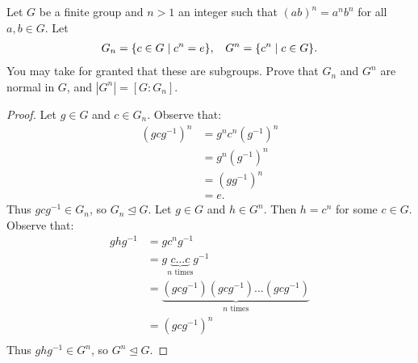 \documentclass[11pt,twoside,openany]{memoir}
\begin{document}
    \begin{exercise}
        Let $G$ be a finite group and $n > 1$ an integer such that $(ab)^n = a^n b^n$ for all $a,b \in G$. Let 
            \begin{equation*}
            \begin{split}
                G_n = \{c \in G \mid c^n = e\}, \h9 G^n = \{c^n \mid c \in G\}.
            \end{split}
            \end{equation*}
        You may take for granted that these are subgroups. Prove that $G_n$ and $G^n$ are normal in $G$, and $|G^n| = [G : G_n]$.
    \end{exercise}
        {\color{blue} \begin{proof}
            Let $g \in G$ and $c \in G_n$. Observe that:
                \begin{equation*}
                \begin{split}
                    (gcg^{-1})^n 
                    & = g^n c^n (g^{-1})^n \\
                    & = g^n (g^{-1})^n \\
                    & = (g g^{-1})^n \\
                    & = e.
                \end{split}
                \end{equation*}
            Thus $gcg^{-1} \in G_n$, so $G_n \unlhd G$. Let $g \in G$ and $h \in G^n$. Then $h = c^n$ for some $c \in G$. Observe that:
                \begin{equation*}
                \begin{split}
                    ghg^{-1} 
                    & = gc^n g^{-1} \\
                    & = g\underbrace{c...c}_{\text{$n$ times}}g^{-1} \\
                    & = \underbrace{(gcg^{-1})(gcg^{-1})...(gcg^{-1})}_{\text{$n$ times}} \\
                    & = (gcg^{-1})^n \\
                \end{split}
                \end{equation*}
            Thus $ghg^{-1} \in G^n$, so $G^n \unlhd G$.


\end{proof}}
\end{document}
